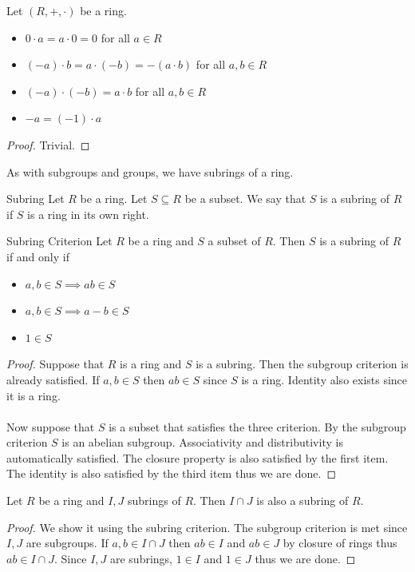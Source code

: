 \documentclass[a4paper]{article}
\begin{document}
\begin{lmm}{}{} Let $(R,+,\cdot)$ be a ring. 
\begin{itemize}
\item $0\cdot a=a\cdot 0=0$ for all $a\in R$
\item $(-a)\cdot b=a\cdot (-b)=-(a\cdot b)$ for all $a,b\in R$
\item $(-a)\cdot (-b)=a\cdot b$ for all $a,b\in R$
\item $-a=(-1)\cdot a$
\end{itemize}\tcbline
\begin{proof}
Trivial. 
\end{proof}
\end{lmm}

As with subgroups and groups, we have subrings of a ring. 

\begin{defn}{Subring}{} Let $R$ be a ring. Let $S\subseteq R$ be a subset. We say that $S$ is a subring of $R$ if $S$ is a ring in its own right. 
\end{defn}

\begin{prp}{Subring Criterion}{} Let $R$ be a ring and $S$ a subset of $R$. Then $S$ is a subring of $R$ if and only if 
\begin{itemize}
\item $a,b\in S\implies ab\in S$
\item $a,b\in S\implies a-b\in S$
\item $1\in S$
\end{itemize}\tcbline
\begin{proof}
Suppose that $R$ is a ring and $S$ is a subring. Then the subgroup criterion is already satisfied. If $a,b\in S$ then $ab\in S$ since $S$ is a ring. Identity also exists since it is a ring. \\~\\
Now suppose that $S$ is a subset that satisfies the three criterion. By the subgroup criterion $S$ is an abelian subgroup. Associativity and distributivity is automatically satisfied. The closure property is also satisfied by the first item. The identity is also satisfied by the third item thus we are done. 
\end{proof}
\end{prp}

\begin{prp}{}{} Let $R$ be a ring and $I,J$ subrings of $R$. Then $I\cap J$ is also a subring of $R$. \tcbline
\begin{proof}
We show it using the subring criterion. The subgroup criterion is met since $I,J$ are subgroups. If $a,b\in I\cap J$ then $ab\in I$ and $ab\in J$ by closure of rings thus $ab\in I\cap J$. Since $I,J$ are subrings, $1\in I$ and $1\in J$ thus we are done. 
\end{proof}
\end{prp}
\end{document}

